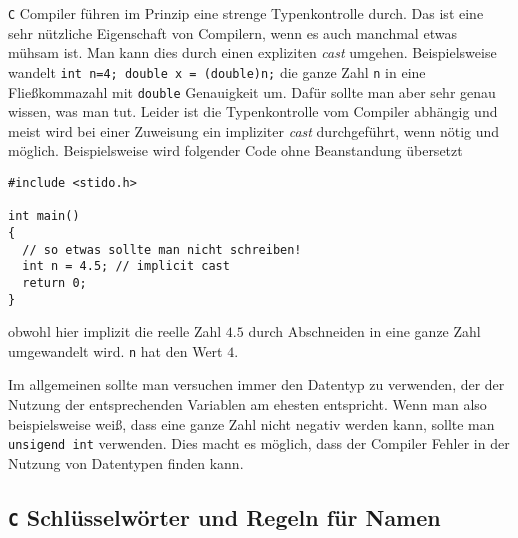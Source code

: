 \texttt{C} Compiler führen im Prinzip eine strenge Typenkontrolle durch.
Das ist eine sehr nützliche Eigenschaft von Compilern, wenn es auch manchmal etwas mühsam ist. 
Man kann dies durch einen expliziten \emph{cast} umgehen.
Beispielsweise wandelt \texttt{int n=4; double x = (double)n;} die ganze Zahl \texttt{n} in eine Fließkommazahl mit \texttt{double} Genauigkeit um.
Dafür sollte man aber sehr genau wissen, was man tut.
Leider ist die Typenkontrolle vom Compiler abhängig und meist wird bei einer Zuweisung ein impliziter \emph{cast} durchgeführt, wenn nötig und möglich.
Beispielsweise wird folgender Code ohne Beanstandung übersetzt

\begin{minipage}{\linewidth}
\begin{lstlisting}[caption={Ungenaue Variablenzuweisung, implicit cast}, belowcaptionskip=0.3em]
#include <stido.h>

int main()
{
  // so etwas sollte man nicht schreiben!
  int n = 4.5; // implicit cast
  return 0;
}
\end{lstlisting}
\end{minipage}
obwohl hier implizit die reelle Zahl $4.5$ durch Abschneiden in eine ganze Zahl umgewandelt wird.
\texttt{n} hat den Wert $4$.

Im allgemeinen sollte man versuchen immer den Datentyp zu verwenden, der der Nutzung der entsprechenden Variablen am ehesten entspricht.
Wenn man also beispielsweise weiß, dass eine ganze Zahl nicht negativ werden kann, sollte man \texttt{unsigend int} verwenden.
Dies macht es möglich, dass der Compiler Fehler in der Nutzung von Datentypen finden kann.

\subsection{\texttt{C} Schlüsselwörter und Regeln für Namen}

